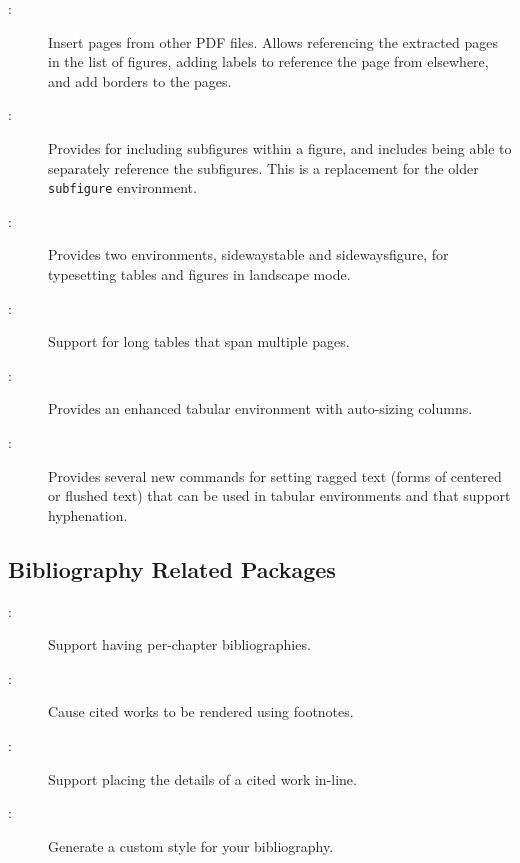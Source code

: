 \begin{description}
\item[:]
Insert pages from other PDF files.  Allows referencing the extracted
pages in the list of figures, adding labels to reference the page
from elsewhere, and add borders to the pages.

\item[:]
Provides for including subfigures within a figure, and includes
being able to separately reference the subfigures.  This is a
replacement for the older \texttt{subfigure} environment.

\item[:]
Provides two environments, sidewaystable and sidewaysfigure,
for typesetting tables and figures in landscape mode.  

\item[:]
Support for long tables that span multiple pages.

\item[:]
Provides an enhanced tabular environment with auto-sizing columns.

\item[:]
Provides several new commands for setting ragged text (\eg forms
of centered or flushed text) that can be used in tabular
environments and that support hyphenation.

\end{description}


\subsection{Bibliography Related Packages}

\begin{description}
\item[:]
Support having per-chapter bibliographies.

\item[:]
Cause cited works to be rendered using footnotes.

\item[:] 
Support placing the details of a cited work in-line.

\item[:]
Generate a custom style for your bibliography.

\end{description}


